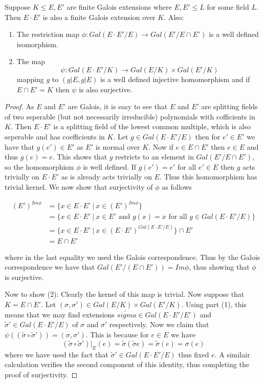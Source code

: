 \documentclass[twoside, a4paper, 10pt]{amsart}
\begin{document}
\begin{prop} Suppose $K \leq E, E'$ are finite Galois extensions where $E,E' \leq L$ for some field $L$. Then $E \cdot E'$ is also a finite Galois extension over $K$. Also:
\begin{enumerate}
	\item The restriction map $\phi:Gal(E \cdot E'/E) \to Gal(E'/E \cap E')$ is a well defined isomorphism. 
	\item The map $$\psi:Gal(E \cdot E' /K) \to Gal(E/K) \times Gal(E'/K)$$ mapping $g$ to $(g|E, g|E)$ is a well defined injective homomorphism and if $E \cap E' = K$ then $\psi$ is also surjective.
\end{enumerate}

\end{prop}

\begin{proof} As $E$ and $E'$ are Galois, it is easy to see that $E$ and $E'$ are splitting fields of two seperable (but not necessarily irreducible) polynomials with cofficients in $K$. Then $E \cdot E'$ is a splitting field of the lowest common multiple, which is also seperable and has coefficients in $K$. Let $g \in Gal(E \cdot E' /E)$ then for $e' \in E'$ we have that $g(e') \in E'$ as $E'$ is normal over $K$. Now if $e \in E \cap E'$ then $e \in E$ and thus $g(e) = e$. This shows that $g$ restricts to an element in $Gal(E' / E \cap E')$, so the homomorphism $\phi$ is well defined. If $g(e') = e'$ for all $e' \in E$ then $g$ acts trivially on $E \cdot E'$ as is already acts trivially on $E$. Thus this homomorphism has trivial kernel. We now show that surjectivity of $\phi$ as follows

\begin{align*} (E')^{Im \phi} &= \{ x \in E \cdot E' ~|~ x \in (E')^{Im \phi} \} \\
&= \{x \in E \cdot E' ~|~ x \in E' \text{ and } g(x) = x \text{ for all } g \in Gal(E \cdot E'/E) \} \\
&= \{ x \in E \cdot E' ~|~ x \in (E\cdot E')^{Gal(E \cdot E'/E)} \} \cap E' \\
&= E \cap E'  \end{align*}

where in the last equality we used the Galois correspondence. Thus by the Galois correspondence we have that $Gal(E' / (E\cap E')) = Im \phi$, thus showing that $\phi$ is surjective.

Now to show (2): Clearly the kernel of this map is trivial. Now suppose that $K = E \cap E'$. Let $(\sigma, \sigma') \in Gal(E/K) \times Gal(E'/K)$. Using part (1), this means that we may find extensions $\tilde{sigma} \in Gal(E \cdot E' /E')$ and $\tilde{\sigma}' \in Gal(E \cdot E'/E)$ of $\sigma$ and $\sigma'$ respectively. Now we claim that $\psi((\tilde{\sigma} \circ \tilde{\sigma}')) = (\sigma, \sigma')$. This is because for $e \in E$ we have $$(\tilde{\sigma} \circ \tilde{\sigma}')|_E(e) = \tilde{\sigma}(\tilde{\sigma}e) = \tilde{\sigma}(e) = \sigma(e) $$ where we have used the fact that $\tilde{\sigma}'  \in Gal(E \cdot E'/E)$ thus fixed $e$. A similair calculation verifies the second component of this identity, thus completing the proof of surjectivity. \end{proof}
\end{document}
